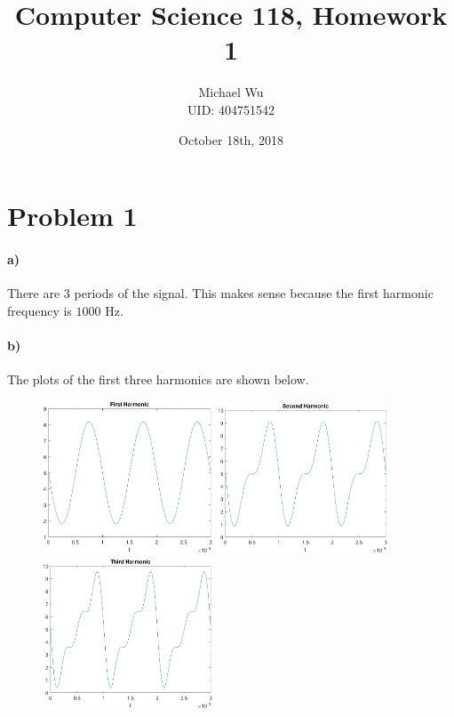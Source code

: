 \documentclass[12pt]{article}
\begin{document}
\title{Computer Science 118, Homework 1}
\date{October 18th, 2018}
\author{Michael Wu\\UID: 404751542}
\maketitle

\section*{Problem 1}

\paragraph{a)}

There are 3 periods of the signal. This makes sense because the first harmonic frequency is \(1000\) Hz.

\paragraph{b)}

The plots of the first three harmonics are shown below.
\begin{figure}[H]
    \begin{adjustwidth}{-2in}{-2in}
        \begin{center}
            \includegraphics[width=2in]{problem1-first.pdf}
            \includegraphics[width=2in]{problem1-second.pdf}
            \includegraphics[width=2in]{problem1-third.pdf}
        \end{center}
    \end{adjustwidth}
\end{figure}
\end{document}
